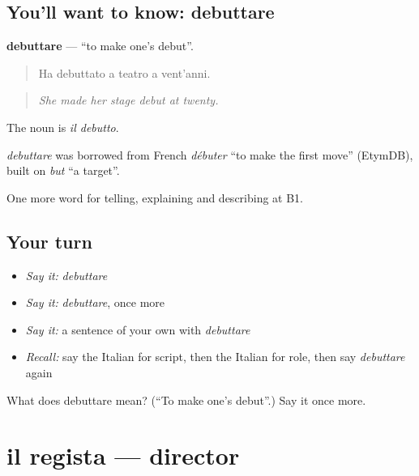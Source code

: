 \subsection*{You'll want to know: debuttare}
\textbf{debuttare} — \textquotedblleft{}to make one's debut\textquotedblright{}.

\begin{quote}
Ha debuttato a teatro a vent'anni.
\end{quote}

\begin{quote}
\emph{She made her stage debut at twenty.}
\end{quote}

The noun is \emph{il debutto}.

\begin{cousinweb}
\emph{debuttare} was borrowed from French \emph{débuter} \textquotedblleft{}to make the first move\textquotedblright{} (EtymDB), built on \emph{but} \textquotedblleft{}a target\textquotedblright{}.
\end{cousinweb}

\begin{grammarlens}[title={What you've built}]
One more word for telling, explaining and describing at B1.
\end{grammarlens}

\subsection*{Your turn}
\begin{itemize}
\raggedright
  \item \emph{Say it:} \emph{debuttare}
  \item \emph{Say it:} \emph{debuttare}, once more
  \item \emph{Say it:} a sentence of your own with \emph{debuttare}
  \item \emph{Recall:} say the Italian for script, then the Italian for role, then say \emph{debuttare} again
\end{itemize}

\begin{tcolorbox}[breakable,colback=teal!4,colframe=teal!35!black,title={Before you move on}]
What does debuttare mean? (\textquotedblleft{}To make one's debut\textquotedblright{}.) Say it once more.
\end{tcolorbox}
\section[il regista]{il regista — director}

